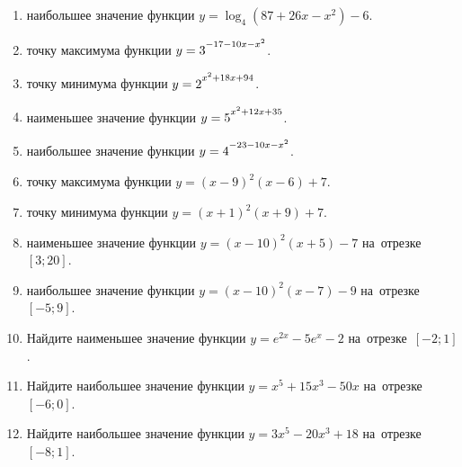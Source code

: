 \documentclass[a4paper,10pt]{article}
\begin{document}
\begin{enumerate}
\item {} наибольшее значение функции $y=\log_4\left(87+26x-x^2\right)-6$.

\item {} точку максимума функции $y=3\strut^{-17-10x-x^2}$.

\item {} точку минимума функции $y=2\strut^{x^2+18x+94}$.

\item {} наименьшее значение функции $y=5\strut^{x^2+12x+35}$.

\item {} наибольшее значение функции $y=4\strut^{-23-10x-x^2}$.

\item {} точку максимума функции $y=\left(x-9\right)^2\left(x-6\right)+7$.

\item {} точку минимума функции $y=\left(x+1\right)^2\left(x+9\right)+7$.

\item {} наименьшее значение функции $y=\left(x-10\right)^2\left(x+5\right)-7$ на~отрезке~$\left[3;20\right]$.

\item {} наибольшее значение функции $y=\left(x-10\right)^2\left(x-7\right)-9$ на~отрезке~$\left[-5;9\right]$.

\item Найдите наименьшее значение функции $y=e^{2x}-5e^x-2$ на~отрезке~$\left[-2;1\right]$.

\item Найдите наибольшее значение функции $y=x^5+15x^3-50x$ на~отрезке~$\left[-6;0\right]$.

\item Найдите наибольшее значение функции $y=3x^5-20x^3+18$ на~отрезке~$\left[-8;1\right]$.

\end{enumerate}
\end{document}
